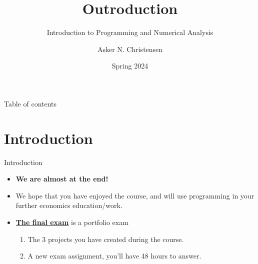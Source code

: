 \documentclass[10pt,english,t,aspectratio=169]{beamer}
\title{Outroduction\vspace{-2mm}}
\subtitle{Introduction to Programming and Numerical Analysis \vspace{-4mm} }
\author{Asker N. Christensen}
\date{Spring 2024}
\makeatletter
\let\origtableofcontents=\tableofcontents
\def\tableofcontents{\@ifnextchar[{\origtableofcontents}{\gobbletableofcontents}}
\def\gobbletableofcontents#1{\origtableofcontents}
\makeatother
\begin{document}
{
\begin{frame}

\maketitle

\end{frame}
}
\addtocounter{framenumber}{-1}


\begin{frame}{Table of contents}
    \tableofcontents[]
\end{frame}


\section{Introduction}
\begin{frame}{Introduction}
    \begin{itemize}
        \item \textbf{We are almost at the end!}
        \item We hope that you have enjoyed the course, and will use programming in your further economics education/work.
        \item \textbf{\href{https://github.com/NumEconCopenhagen/IntroProg-lectures/blob/main/projects/ExamProject.pdf}{The final exam}} is a portfolio exam 
        \begin{enumerate}[-]
            \item The 3 projects you have created during the course.
            \item A new exam assignment, you'll have 48 hours to answer.
        \end{enumerate}
        
    \end{itemize}
\end{frame}
\end{document}
